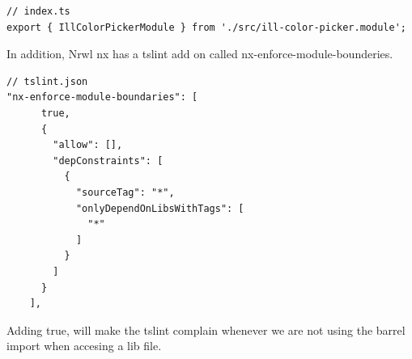 \begin{lstlisting}
// index.ts
export { IllColorPickerModule } from './src/ill-color-picker.module';
\end{lstlisting}

In addition, Nrwl nx has a tslint add on called nx-enforce-module-bounderies.
\begin{lstlisting}
// tslint.json
"nx-enforce-module-boundaries": [
      true,
      {
        "allow": [],
        "depConstraints": [
          {
            "sourceTag": "*",
            "onlyDependOnLibsWithTags": [
              "*"
            ]
          }
        ]
      }
    ],
\end{lstlisting}

Adding true, will make the tslint complain whenever we are not using the barrel
import when accesing a lib file.
